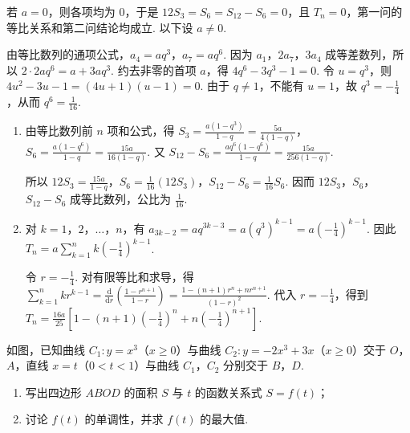 \begin{solution}
若 \(a=0\)，则各项均为 \(0\)，于是 \(12S_3=S_6=S_{12}-S_6=0\)，且 \(T_n=0\)，第一问的等比关系和第二问结论均成立. 以下设 \(a\ne0\).

由等比数列的通项公式，\(a_4=aq^3\)，\(a_7=aq^6\). 因为 \(a_1\)，\(2a_7\)，\(3a_4\) 成等差数列，所以
\(2\cdot2aq^6=a+3aq^3\). 约去非零的首项 \(a\)，得
\(4q^6-3q^3-1=0\). 令 \(u=q^3\)，则
\(4u^2-3u-1=(4u+1)(u-1)=0\). 由于 \(q\ne1\)，不能有 \(u=1\)，故 \(q^3=-\frac{1}{4}\)，从而 \(q^6=\frac{1}{16}\).

\begin{enumerate}
\item 由等比数列前 \(n\) 项和公式，得
\(\displaystyle S_3=\frac{a(1-q^3)}{1-q}=\frac{5a}{4(1-q)}\)，
\(\displaystyle S_6=\frac{a(1-q^6)}{1-q}=\frac{15a}{16(1-q)}\). 又
\(\displaystyle S_{12}-S_6=\frac{aq^6(1-q^6)}{1-q}=\frac{15a}{256(1-q)}\).

所以
\(\displaystyle 12S_3=\frac{15a}{1-q}\)，\(S_6=\frac{1}{16}(12S_3)\)，\(S_{12}-S_6=\frac{1}{16}S_6\). 因而 \(12S_3\)，\(S_6\)，\(S_{12}-S_6\) 成等比数列，公比为 \(\frac{1}{16}\).

\item 对 \(k=1\)，\(2\)，\(\ldots\)，\(n\)，有 \(a_{3k-2}=aq^{3k-3}=a(q^3)^{k-1}=a\left(-\frac{1}{4}\right)^{k-1}\). 因此
\(\displaystyle T_n=a\sum_{k=1}^{n}k\left(-\frac{1}{4}\right)^{k-1}\).

令 \(r=-\frac{1}{4}\). 对有限等比和求导，得
\(\displaystyle\sum_{k=1}^{n}kr^{k-1}=\frac{\mathrm d}{\mathrm dr}\left(\frac{1-r^{n+1}}{1-r}\right)=\frac{1-(n+1)r^n+nr^{n+1}}{(1-r)^2}\).
代入 \(r=-\frac{1}{4}\)，得到
\(\displaystyle T_n=\frac{16a}{25}\left[1-(n+1)\left(-\frac{1}{4}\right)^n+n\left(-\frac{1}{4}\right)^{n+1}\right]\).
\end{enumerate}
\end{solution}

\begin{problem}
如图，已知曲线 \(C_1: y = x^3\)（\(x \geqslant 0\)）与曲线 \(C_2: y = -2x^3 + 3x\)（\(x \geqslant 0\)）交于 \(O\)，\(A\)，直线 \(x = t\)（\(0 < t < 1\)）与曲线 \(C_1\)，\(C_2\) 分别交于 \(B\)，\(D\).

\begin{enumerate}
\item 写出四边形 \(ABOD\) 的面积 \(S\) 与 \(t\) 的函数关系式 \(S = f(t)\)；
\item 讨论 \(f(t)\) 的单调性，并求 \(f(t)\) 的最大值.
\end{enumerate}

\end{problem}

